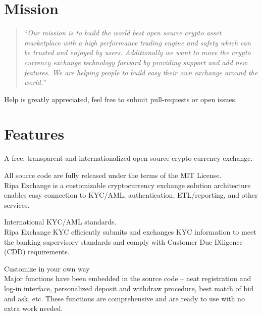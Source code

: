\documentclass[11pt,fleqn,oneside]{book} %
\begin{document}
\section{Mission}
\begin{quotation}
	``\textit{Our mission is to build the world best open source crypto asset marketplace with a high performance trading engine 
	and safety which can be trusted and enjoyed by users. Additionally we want to move the crypto currency exchange technology 
	forward by providing support and add new features. We are helping people to build easy their own exchange around the world.}''
\end{quotation}

Help is greatly appreciated, feel free to submit pull-requests or open issues.

\section{Features}
A free, transparent and internationalized open source crypto currency exchange.\\

\begin{tcolorbox}[featureBox,
	title=\textsc{Open Source}]

	\small	All source code are fully released under the terms of the MIT License.\\\vspace{5mm}
	\tiny Ripa Exchange is a customizable cryptocurrency exchange solution architecture enables easy connection to KYC/AML, 
	authentication, ETL/reporting, and other services.
\end{tcolorbox}
\begin{tcolorbox}[featureBox,
	title=\textsc{Compliant}]

	\small	International KYC/AML standards.\\\vspace{5mm}
	\tiny Ripa Exchange KYC efficiently submits and exchanges KYC information 
	to meet the banking supervisory standards and comply with Customer Due Diligence (CDD) requirements.
\end{tcolorbox}
\begin{tcolorbox}[featureBox,
	title=\textsc{Transparent \& Configurable}]

	\small	Customize in your own way\\\vspace{5mm}
	\tiny Major functions have been embedded in the source code – neat registration and log-in interface, 
	personalized deposit and withdraw procedure, best match of bid and ask, etc. These functions are comprehensive 
	and are ready to use with no extra work needed. 
\end{tcolorbox}
\end{document}
